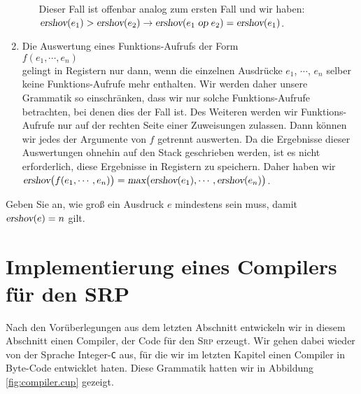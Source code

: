 \begin{enumerate}
\begin{enumerate}
            Dieser Fall ist offenbar analog zum ersten Fall und wir haben:
            \\[0.2cm]
            \hspace*{1.3cm}
            $\textsl{ershov}(e_1) > \textsl{ershov}(e_2) \rightarrow 
             \textsl{ershov}(e_1 \;\textsl{op}\; e_2) = \textsl{ershov}(e_1)$.
      \end{enumerate}
\item Die Auswertung eines Funktions-Aufrufs der Form
      \\[0.2cm]
      \hspace*{1.3cm}
      $f(e_1, \cdots, e_n)$
      \\[0.2cm]
      gelingt in Registern nur dann, wenn die einzelnen Ausdr\"ucke $e_1$, $\cdots$, $e_n$
      selber keine Funktions-Aufrufe mehr enthalten.  Wir werden daher unsere Grammatik so
      einschr\"anken, dass wir nur solche Funktions-Aufrufe betrachten, bei denen dies der
      Fall ist.  Des Weiteren werden wir Funktions-Aufrufe nur auf der rechten Seite einer
      Zuweisungen zulassen.  Dann k\"onnen wir jedes der Argumente von $f$ getrennt
      auswerten.  Da die Ergebnisse dieser Auswertungen ohnehin auf den Stack geschrieben
      werden, ist es nicht erforderlich, diese Ergebnisse in Registern zu speichern.
      Daher haben wir
      \\[0.2cm]
      \hspace*{1.3cm}
      $\textsl{ershov}\bigl(f(e_1, \cdots, e_n)\bigr) = 
       \textsl{max}\bigl( \textsl{ershov}(e_1), \cdots, \textsl{ershov}(e_n)\bigr)$.     
\end{enumerate}

\exercise
Geben Sie an, wie gro{\ss} ein Ausdruck $e$ mindestens sein muss, damit 
$\textsl{ershov}(e) = n$ gilt.



\section{Implementierung eines Compilers f\"ur den \textsc{SRP}}
Nach den Vor\"uberlegungen aus dem letzten Abschnitt entwickeln wir 
in diesem Abschnitt einen Compiler, der Code f\"ur den \textsc{Srp} erzeugt.
Wir gehen dabei wieder von der Sprache Integer-\texttt{C} aus, f\"ur die wir 
im letzten Kapitel einen Compiler in Byte-Code entwicklet haten.
  Diese Grammatik hatten wir in Abbildung \ref{fig:compiler.cup} gezeigt.

